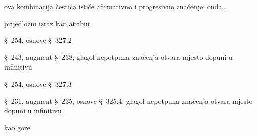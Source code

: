 \begin{description}[noitemsep]
\item[μὲν δὴ] ova kombinacija čestica ističe afirmativno i progresivno značenje: onda\dots
\item[περὶ ἀλλήλων] prijedložni izraz kao atribut
\item[ἦλθε] §~254, osnove §~327.2
\item[ἐπεθύμει] §~243, augment §~238; glagol nepotpuna značenja otvara mjesto dopuni u infinitivu
\item[ἰδεῖν] §~254, osnove §~327.3
\item[ἤθελεν] §~231, augment §~235, osnove §~325.4; glagol nepotpuna značenja otvara mjesto dopuni u infinitivu
\item[ἰδεῖν] kao gore
\end{description}




